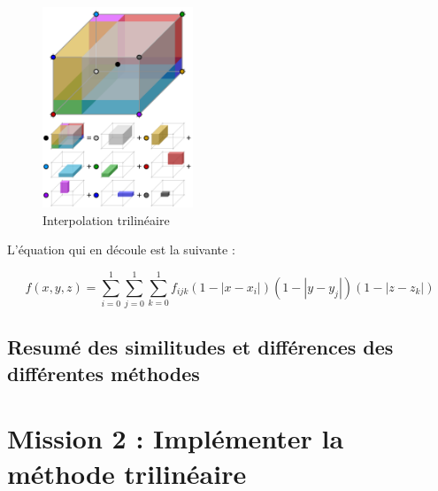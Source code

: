 \begin{figure}[ht!]
    \centering
    \includegraphics[width=0.4\textwidth]{images/Trilinear_interpolation_visualisation.svg.png}
    \caption{Interpolation trilinéaire} %
\end{figure}

L'équation qui en découle est la suivante :

\begin{equation}
    f(x, y, z) = \sum_{i=0}^{1} \sum_{j=0}^{1} \sum_{k=0}^{1} f_{ijk} (1 - |x - x_i|)(1 - |y - y_j|)(1 - |z - z_k|)
\end{equation}



\subsection{Resumé des similitudes et différences des différentes méthodes}



\section{Mission 2 : Implémenter la méthode trilinéaire}
